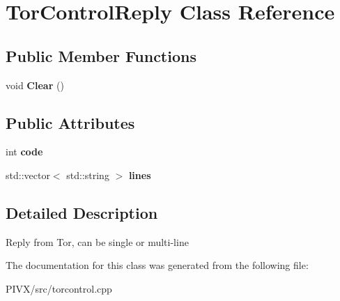 \hypertarget{class_tor_control_reply}{}\section{Tor\+Control\+Reply Class Reference}
\label{class_tor_control_reply}
\subsection*{Public Member Functions}
\begin{DoxyCompactItemize}
\item 
\mbox{\label{class_tor_control_reply_a94cbd96ffa94322e84ea47daa8ca62bb}} 
void {\bfseries Clear} ()
\end{DoxyCompactItemize}
\subsection*{Public Attributes}
\begin{DoxyCompactItemize}
\item 
\mbox{\label{class_tor_control_reply_aba46f4c0571808c99097edd3246c2f6a}} 
int {\bfseries code}
\item 
\mbox{\label{class_tor_control_reply_ae9c09a2c2d674c1554c91ace852e5269}} 
std\+::vector$<$ std\+::string $>$ {\bfseries lines}
\end{DoxyCompactItemize}


\subsection{Detailed Description}
Reply from Tor, can be single or multi-\/line 

The documentation for this class was generated from the following file\+:\begin{DoxyCompactItemize}
\item 
P\+I\+V\+X/src/torcontrol.\+cpp\end{DoxyCompactItemize}
